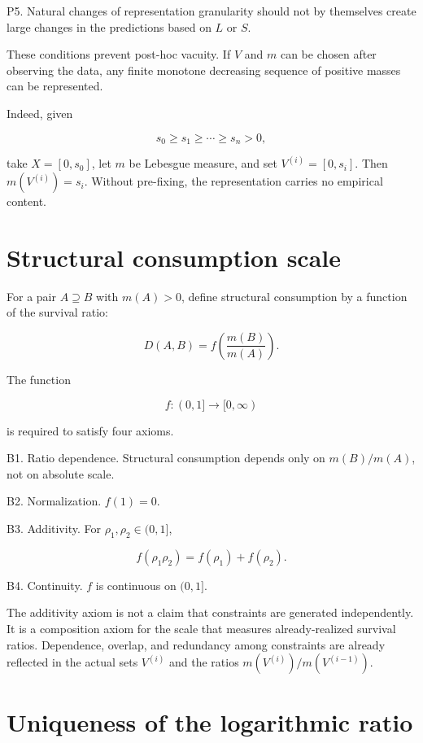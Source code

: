 \documentclass[12pt,a4paper]{article}
\begin{document}
P5. Natural changes of representation granularity should not by themselves create large changes in the predictions based on \(L\) or \(S\).

These conditions prevent post-hoc vacuity. If \(V\) and \(m\) can be chosen after observing the data, any finite monotone decreasing sequence of positive masses can be represented.

Indeed, given

\[
s_0\ge s_1\ge \cdots \ge s_{n}>0,
\]

take \(X=[0,s_0]\), let \(m\) be Lebesgue measure, and set \(V^{(i)}=[0,s_{i}]\). Then \(m(V^{(i)})=s_{i}\). Without pre-fixing, the representation carries no empirical content.

\section{Structural consumption scale}\label{structural-consumption-scale}

For a pair \(A\supseteq B\) with \(m(A)>0\), define structural consumption by a function of the survival ratio:

\[
D(A,B)=f\left(\frac{m(B)}{m(A)}\right).
\]

The function

\[
f:(0,1]\to[0,\infty)
\]

is required to satisfy four axioms.

B1. Ratio dependence. Structural consumption depends only on \(m(B)/m(A)\), not on absolute scale.

B2. Normalization. \(f(1)=0\).

B3. Additivity. For \(\rho_1,\rho_2\in(0,1]\),

\[
f(\rho_1\rho_2)=f(\rho_1)+f(\rho_2).
\]

B4. Continuity. \(f\) is continuous on \((0,1]\).

The additivity axiom is not a claim that constraints are generated independently. It is a composition axiom for the scale that measures already-realized survival ratios. Dependence, overlap, and redundancy among constraints are already reflected in the actual sets \(V^{(i)}\) and the ratios \(m(V^{(i)})/m(V^{(i-1)})\).

\section{Uniqueness of the logarithmic ratio}\label{uniqueness-of-the-logarithmic-ratio}
\end{document}
